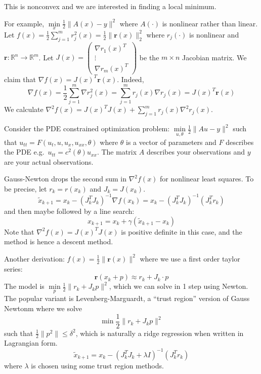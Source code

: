 \documentclass[english, 11pt]{article}
\DeclareMathOperator*{\argmin}{arg\,min}
\begin{document}
This is nonconvex and we are interested in finding a local minimum.

For example, $\min \limits_x \frac{1}{2} \|A(x)-y\|^2$ where $A(\cdot)$ is nonlinear rather than linear.
Let $f(x) = \frac{1}{2} \sum_{j=1}^m r_j^2(x)= \frac{1}{2} \| \mathbf{r}(x) \|_2^2$ where $r_j(\cdot)$ is nonlinear and $\mathbf{r}:\mathbb{R}^n \to \mathbb{R}^m$. Let $J(x) = \begin{pmatrix} \nabla r_1 (x)^T \\ \vdots \\ \nabla r_m(x)^T \end{pmatrix}$ be the $m \times n$ Jacobian matrix. We claim that $\nabla f(x) = J(x)^T \mathbf{r}(x)$. Indeed,
\[
\nabla f(x) = \frac{1}{2} \sum_{j=1}^m \nabla r_j^2(x) = \sum_{j=1}^m r_j(x) \nabla r_j(x) = J(x)^T \mathbf{r}(x)
\]
We calculate $\nabla^2 f(x) = J(x)^T J(x) + \sum_{j=1}^m r_j(x) \nabla^2 r_j(x)$. 

\begin{exmp}
Consider the PDE constrained optimization problem: $\min \limits_{u,\theta} \frac{1}{2} \|A u-y\|^2$ such that $u_{tt} = F(u_t, u, u_x, u_{xx}, \theta)$ where $\theta$ is a vector of parameters and $F$ describes the PDE e.g.\ $u_{tt} = c^2(\theta) u_{xx}$. The matrix $A$ describes your observations and $y$ are your actual observations. 
\end{exmp}

\begin{rem}
Gauss-Newton drops the second sum in $\nabla^2 f(x)$ for nonlinear least squares. To be precise, let $r_k = r(x_k)$ and $J_k = J(x_k)$.
\[
\tilde{x}_{k+1} = x_k - (J_k^T J_k)^{-1} \nabla f(x_k) = x_k - (J_k^T J_k)^{-1} (J_k^T r_k) 
\]
and then maybe followed by a line search:
\[
x_{k+1} = x_k + \gamma( \tilde{x}_{k+1} - x_k)
\]
Note that $\nabla^2 f(x) = J(x)^T J(x)$ is positive definite in this case, and the method is hence a descent method.

Another derivation: $f(x) = \frac{1}{2} \| \mathbf{r}(x)\|^2$ where we use a first order taylor series:
\[
\mathbf{r}(x_k + p) \approx r_k + J_k \cdot p
\]
The model is $\min \limits_p \frac{1}{2} \|r_k + J_k p \|^2$, which we can solve in 1 step using Newton. The popular variant is Levenberg-Marguardt, a ``trust region'' version of Gauss Newtonm where we solve
\[
\min \frac{1}{2} \|r_k + J_k p\|^2
\]
such that $\frac{1}{2} \|p^2\| \le \delta^2$, which is naturally a ridge regression when written in Lagrangian form.
\[
\tilde{x}_{k+1} = x_k - (J_k^T J_k+ \lambda I)^{-1}(J_k^T r_k) 
\]
where $\lambda$ is chosen using some trust region methods.


\end{rem}
\end{document}
